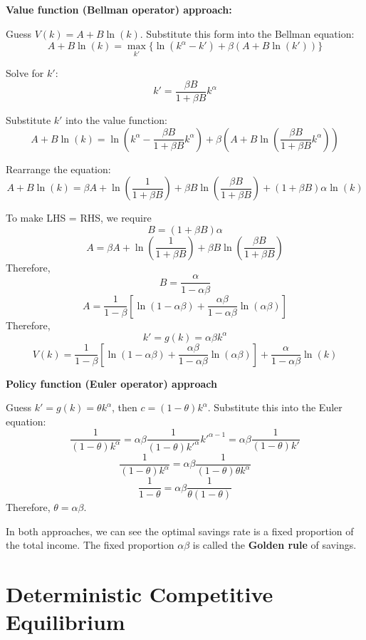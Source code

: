 \documentclass[10pt,a4]{article}
\begin{document}
\par\null

\textbf{Value function (Bellman operator) approach:}

\par\null

Guess $V(k) = A + B \ln(k)$. Substitute this form into the Bellman equation:
$$ A + B \ln(k) = \max_{k'} \{\ln(k^{\alpha} - k') + \beta(A + B \ln(k'))\}$$

Solve for $k'$: 
$$k' = \frac{\beta B}{1 + \beta B} k^{\alpha}$$

Substitute $k'$ into the value function:
$$ A + B \ln(k) = \ln(k^{\alpha} - \frac{\beta B}{1 + \beta B} k^{\alpha}) + \beta(A + B \ln(\frac{\beta B}{1 + \beta B} k^{\alpha})) $$

Rearrange the equation:
$$ A + B\ln(k) = \beta A + \ln(\frac{1}{1+\beta B}) + \beta B \ln(\frac{\beta B}{1+\beta B}) + (1+\beta B)\alpha \ln(k) $$

To make LHS = RHS, we require
$$ B = (1+\beta B)\alpha $$
$$ A = \beta A + \ln(\frac{1}{1+\beta B}) + \beta B \ln(\frac{\beta B}{1+\beta B}) $$
Therefore, 
$$ B = \frac{\alpha}{1-\alpha\beta}$$
$$ A = \frac{1}{1-\beta}\left[\ln(1-\alpha\beta)+\frac{\alpha\beta}{1-\alpha\beta}\ln(\alpha\beta)\right]$$
Therefore, 
$$ k' = g(k) = \alpha\beta k^{\alpha} $$
$$ V(k) = \frac{1}{1-\beta}\left[\ln(1-\alpha\beta)+\frac{\alpha\beta}{1-\alpha\beta}\ln(\alpha\beta)\right] + \frac{\alpha}{1-\alpha\beta}\ln(k)$$

\textbf{Policy function (Euler operator) approach}

\par\null

Guess $k' = g(k) = \theta k^{\alpha}$, then $c = (1-\theta)k^{\alpha}$. Substitute this into the Euler equation:
$$ \frac{1}{(1-\theta)k^{\alpha}} = \alpha\beta\frac{1}{(1-\theta)k'^{\alpha}}k'^{\alpha-1} = \alpha\beta\frac{1}{(1-\theta)k'}$$
$$ \frac{1}{(1-\theta)k^{\alpha}} = \alpha\beta\frac{1}{(1-\theta)\theta k^{\alpha}}$$
$$\frac{1}{1-\theta} = \alpha\beta\frac{1}{\theta(1-\theta)}$$
Therefore, $\theta = \alpha\beta$.



In both approaches, we can see the optimal savings rate is a fixed proportion of the total income. The fixed proportion $\alpha\beta$ is called the \textbf{Golden rule} of savings.

\newpage

\section{Deterministic Competitive
Equilibrium}
\end{document}
